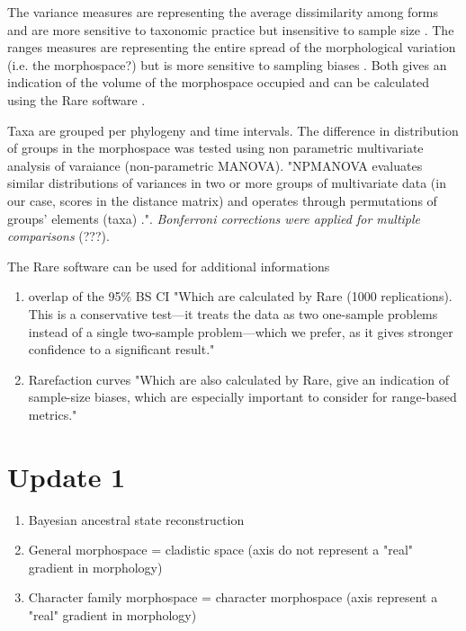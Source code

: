 \documentclass[a4paper,11pt]{article}
\begin{document}
The variance measures are representing the average dissimilarity among forms and are more sensitive to taxonomic practice but insensitive to sample size \citep{BIJ:BIJ45}.
The ranges measures are representing the entire spread of the morphological variation (i.e. the morphospace?) but is more sensitive to sampling biases \citep{BIJ:BIJ455}.
Both gives an indication of the volume of the morphospace occupied and can be calculated using the Rare software \citep{BIJ:BIJ455}.

Taxa are grouped per phylogeny and time intervals.
The difference in distribution of groups in the morphospace was tested using non parametric multivariate analysis of varaiance (non-parametric MANOVA).
"NPMANOVA evaluates similar distributions of variances in two or more groups of multivariate data (in our case, scores in the distance matrix) and operates through permutations of groups’ elements (taxa) \citep{AEC:AEC1070}."\citep{Brusatte12092008}.
\textit{Bonferroni corrections were applied for multiple comparisons} (???).

The Rare software \citep{BIJ:BIJ455} can be used for additional informations
\begin{enumerate}
\item{overlap of the 95\% BS CI}
"Which are calculated by Rare (1000 replications). This is a conservative test—it treats the data as two one-sample problems instead of a single two-sample problem—which we prefer, as it gives stronger confidence to a significant result." \citep{Brusatte12092008}
\item{Rarefaction curves}
"Which are also calculated by Rare, give an indication of sample-size biases, which are especially important to consider for range-based metrics."\citep{Brusatte12092008}
\end{enumerate}



\section{Update 1}
\begin{enumerate}
\item{Bayesian ancestral state reconstruction}
\item{General morphospace = cladistic space (axis do not represent a "real" gradient in morphology)}
\item{Character family morphospace = character morphospace (axis represent a "real" gradient in morphology)}
\end{enumerate}
\end{document}
